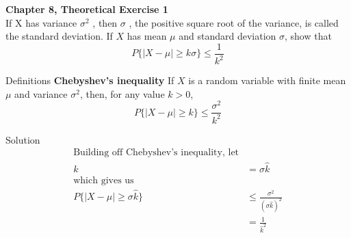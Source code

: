 \documentclass{article}
\begin{document}
\begin{spacing}{1.1}
\newpage
\begin{homeworkProblem}
  {\bf Chapter 8, Theoretical Exercise 1}\\
  If X has variance $\sigma^2$ , then $\sigma$ , the positive square root 
  of the variance, is called the standard deviation. If $X$ has mean $\mu$ 
  and standard deviation $\sigma$, show that
    \[P\{ |X - \mu| \ge k \sigma \} \le \frac{ 1}{ k^2}\]
  \begin{homeworkSection}{Definitions}
    {\bf Chebyshev's inequality}
      If $X$ is a random variable with finite mean $\mu$ and variance $\sigma^2$, 
      then, for any value $k > 0$,
      \[P\{ |X - \mu| \ge k\} \le \frac{ \sigma^2}{ k^2}\]
  \end{homeworkSection}
  \begin{homeworkSection}{Solution}
    \begin{align*}
      \text{Building off Chebyshev's inequality, let}\\
      k &= \sigma \hat k\\
      \text{which gives us}\\
      P\{ |X - \mu| \ge \sigma \hat k\} &\le \frac{ \sigma^2}{ (\sigma \hat k)^2}\\
      &= \frac{ 1}{\hat k^2}
    \end{align*}
  \end{homeworkSection}
\end{homeworkProblem}


\end{spacing}
\end{document}
